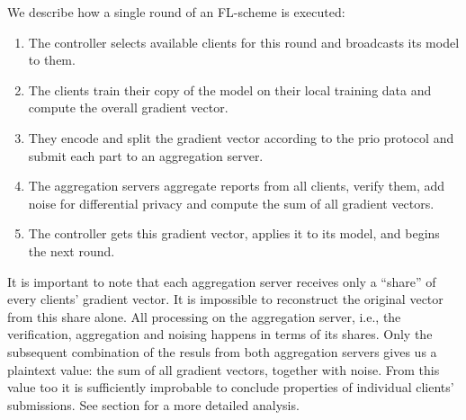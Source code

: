 \documentclass{article}
\begin{document}
We describe how a single round of an FL-scheme is executed:
\begin{enumerate}[itemsep=0mm]
\item The controller selects available clients for this round and broadcasts its model to them.
\item The clients train their copy of the model on their local training data and
  compute the overall gradient vector.
\item They encode and split the gradient vector according to the prio protocol
  and submit each part to an aggregation server.
\item The aggregation servers aggregate reports from all clients, verify them,
  add noise for differential privacy and compute the sum of all gradient vectors.
\item The controller gets this gradient vector, applies it to its model, and
  begins the next round.
\end{enumerate}
It is important to note that each aggregation server receives only a ``share''
of every clients' gradient vector. It is impossible to reconstruct the original
vector from this share alone. All processing on the aggregation server, i.e.,
the verification, aggregation and noising happens in terms of its shares.
Only the subsequent combination of the resuls from both aggregation servers gives
us a plaintext value: the sum of all gradient vectors, together with noise. From
this value too it is sufficiently improbable to conclude properties of
individual clients' submissions. See section  for a more detailed analysis.
\end{document}
